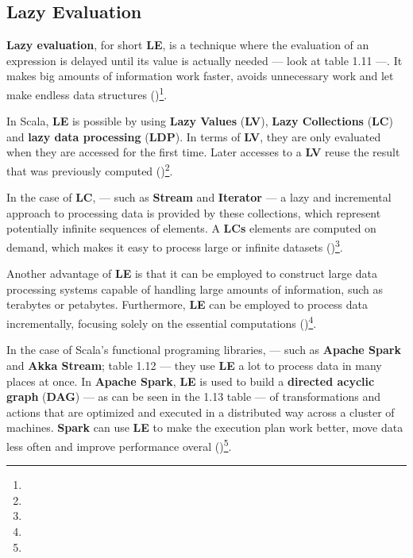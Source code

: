 \subsection{Lazy Evaluation}

\textbf{Lazy evaluation}, for short \textbf{LE}, is a technique where the evaluation of an expression is delayed until its value is actually needed  — look at table 1.11 —. It makes big amounts of information work faster, avoids unnecessary work and let make endless data structures (\cite{scalaLazy})\footnote[12]{}.

In Scala, \textbf{LE} is possible by using \textbf{Lazy Values} (\textbf{LV}), \textbf{Lazy Collections} (\textbf{LC}) and \textbf{lazy data processing} (\textbf{LDP}). In terms of \textbf{LV}, they  are only evaluated when they are accessed for the first time. Later accesses to a \textbf{LV} reuse the result that was previously computed (\cite{michael.etal_2023})\footnote[11]{}.



In the case of \textbf{LC}, — such as \textbf{Stream} and \textbf{Iterator} — a lazy and incremental approach to processing data is provided by these collections, which represent potentially infinite sequences of elements. A \textbf{LCs} elements are computed on demand, which makes it easy to process large or infinite datasets (\cite{hughesWhyFunctionalProgramming1990})\footnote[13]{}.



Another advantage of \textbf{LE} is that it can be employed to construct large data processing systems capable of handling large amounts of information, such as terabytes or petabytes. Furthermore, \textbf{LE} can be employed to process data incrementally, focusing solely on the essential computations (\cite{chenE3ElasticExecution2011})\footnote[14]{}.

In the case of Scala's functional programing libraries, — such as \textbf{Apache Spark} and \textbf{Akka Stream}; table 1.12 — they use \textbf{LE} a lot to process data in many places at once. In \textbf{Apache Spark}, \textbf{LE} is used to build a \textbf{directed acyclic graph} (\textbf{DAG}) — as can be seen in the 1.13 table — of transformations and actions that are optimized and executed in a distributed way across a cluster of machines. \textbf{Spark} can use \textbf{LE} to make the execution plan work better, move data less often and improve performance overal (\cite{michael.etal_2023})\footnote[11]{}.

